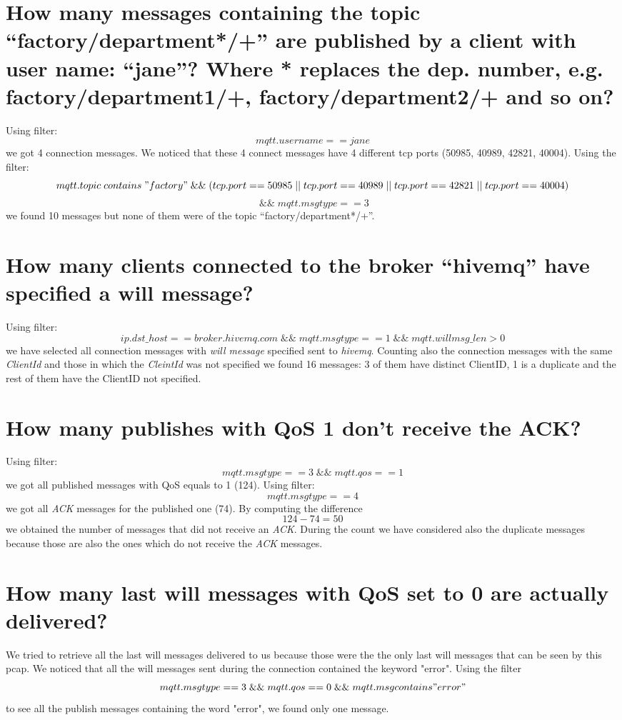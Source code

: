 \documentclass{article}
\begin{document}
\section{How many messages containing the topic
“factory/department*/+” are published by a client with
user name: “jane”? Where * replaces the dep. number,
e.g. factory/department1/+, factory/department2/+
and so on?}
Using filter: \[ mqtt.username == jane\] we got 4 connection messages. We noticed that these 4 connect messages have 4 different tcp ports (50985, 40989, 42821, 40004). \hfill \break
Using the filter: \[ mqtt.topic \; contains \; "factory" \; \&\& \; ( tcp.port == 50985 \; || \; tcp.port == 40989 \; || \; tcp.port == 42821 \; || \; tcp.port == 40004 )\] \[  \; \&\& \; mqtt.msgtype == 3 \]
we found 10 messages but none of them were of the topic “factory/department*/+”.

\section{How many clients connected to the broker “hivemq”
have specified a will message?}
Using filter: \[ ip.dst\_host == broker.hivemq.com \; \&\& \; mqtt.msgtype == 1 \; \&\& \; mqtt.willmsg\_len > 0 \] we have selected
all connection messages with \textit{will message} specified sent to \textit{hivemq}. Counting also the connection messages with the same \textit{ClientId} and those in which the \textit{CleintId} was not specified we found 16 messages: 3 of them have distinct ClientID, 1 is a duplicate and the rest of them have the ClientID not specified.

\section{How many publishes with QoS 1 don't receive the ACK?}
Using filter: \[ mqtt.msgtype == 3 \; \&\& \; mqtt.qos == 1 \] we got all published messages with QoS equals to 1 (124). \hfill \break
Using filter: \[ mqtt.msgtype == 4 \] we got all \textit{ACK} messages for the published one (74). \hfill \break
By computing the difference \[ 124-74 = 50\] we obtained the number of messages that did not receive an \textit{ACK}. \hfill \break
During the count we have considered also the duplicate messages because those are also the ones which do not receive the \textit{ACK} messages.

\section{How many last will messages with QoS set to 0 are
actually delivered?}
We tried to retrieve all the last will messages delivered to us because those were the the only last will messages that can be seen by this pcap. We noticed that all the will messages sent during the connection contained the keyword "error".\hfill\break
Using the filter \[ mqtt.msgtype == 3 \; \&\& \; mqtt.qos == 0 \; \&\& \; mqtt.msg contains "error" \] to see all the publish messages containing the word "error", we found only one message.
\end{document}
